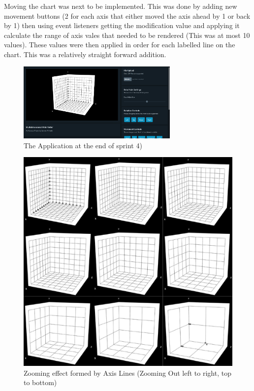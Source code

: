 Moving the chart was next to be implemented. This was done by adding new movement buttons (2 for each axis that either moved the axis ahead by 1 or back by 1) then using event listeners getting the modification value and applying it calculate the range of axis vales that needed to be rendered (This was at most 10 values). These values were then applied in order for each labelled line on the chart. This was a relatively straight forward addition.

\begin{figure}[h]
    \centering
    \includegraphics[width=0.7\textwidth]{author-files/figures/pretestScreenshot.png}
    \caption{The Application at the end of sprint 4)}
    \label{fig:oldzoom}
\end{figure}

\begin{figure}[h]
    \centering
    \includegraphics[width=0.8\columnwidth]{author-files/figures/oldzooms.png}
    \caption{Zooming effect formed by Axis Lines (Zooming Out left to right, top to bottom)}
    \label{fig:oldzoom}
\end{figure}

